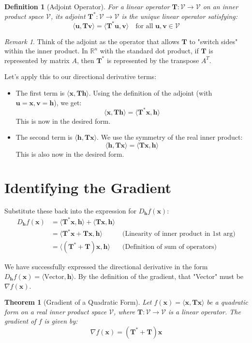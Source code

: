 \documentclass[11pt]{article}
\theoremstyle{mydefinitionstyle}
\newtheorem{definition}{Definition}[section]
\theoremstyle{mytheoremstyle}
\newtheorem{theorem}{Theorem}[section]
\theoremstyle{remark}
\newtheorem{remark}{Remark}[section]
\newcommand{\R}{\mathbb{R}}
\newcommand{\V}{\mathcal{V}} %
\newcommand{\T}{\mathbf{T}} %
\newcommand{\Tadj}{\mathbf{T}^*} %
\newcommand{\x}{\mathbf{x}} %
\newcommand{\h}{\mathbf{h}} %
\newcommand{\uvec}{\mathbf{u}} %
\newcommand{\vvec}{\mathbf{v}} %
\newcommand{\grad}{\nabla} %
\newcommand{\inner}[2]{\langle #1, #2 \rangle} %
\begin{document}
\begin{definition}[Adjoint Operator]
    For a linear operator $\T: \V \to \V$ on an inner product space $\V$, its adjoint $\Tadj: \V \to \V$ is the unique linear operator satisfying:
    \[ \inner{\uvec}{\T\vvec} = \inner{\Tadj\uvec}{\vvec} \quad \text{for all } \uvec, \vvec \in \V \]
\end{definition}
\begin{remark}
    Think of the adjoint as the operator that allows $\T$ to "switch sides" within the inner product. In $\R^n$ with the standard dot product, if $\T$ is represented by matrix $A$, then $\Tadj$ is represented by the transpose $A^T$.
\end{remark}

Let's apply this to our directional derivative terms:
\begin{itemize}
    \item The first term is $\inner{\x}{\T\h}$. Using the definition of the adjoint (with $\uvec=\x, \vvec=\h$), we get:
    \[ \inner{\x}{\T\h} = \inner{\Tadj\x}{\h} \]
    This is now in the desired form.

    \item The second term is $\inner{\h}{\T\x}$. We use the symmetry of the real inner product:
    \[ \inner{\h}{\T\x} = \inner{\T\x}{\h} \]
    This is also now in the desired form.
\end{itemize}

\section{Identifying the Gradient}

Substitute these back into the expression for $D_{\h}f(\x)$:
\begin{align*}
    D_{\h}f(\x) &= \inner{\Tadj\x}{\h} + \inner{\T\x}{\h} \\
    &= \inner{\Tadj\x + \T\x}{\h} \quad &\text{(Linearity of inner product in 1st arg)} \\
    &= \inner{(\Tadj + \T)\x}{\h} \quad &\text{(Definition of sum of operators)}
\end{align*}

We have successfully expressed the directional derivative in the form $D_{\h}f(\x) = \inner{\text{Vector}}{\h}$. By the definition of the gradient, that "Vector" must be $\grad f(\x)$.

\begin{theorem}[Gradient of a Quadratic Form]
    Let $f(\x) = \inner{\x}{\T\x}$ be a quadratic form on a real inner product space $\V$, where $\T: \V \to \V$ is a linear operator. The gradient of $f$ is given by:
    \[ \grad f(\x) = (\Tadj + \T)\x \]
\end{theorem}
\end{document}
